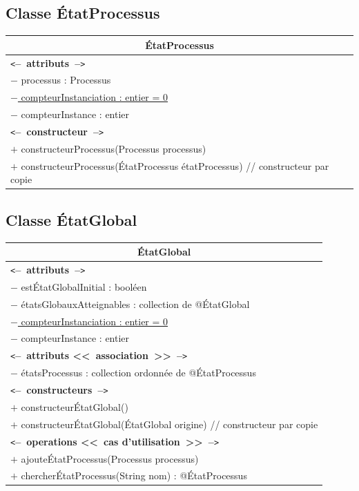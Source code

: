 \documentclass[11pt,article]{article}
\newcommand{\cmt}[1]{\texttt{<}\textbf{--~#1~--}\texttt{>}}
\begin{document}
\subsection{Classe \textsf{ÉtatProcessus}}

\begin{center}
\begin{longtable}{|p{15cm}|} 
\hline
\multicolumn{1}{|c|}{{\Large \textsf{ÉtatProcessus}}} \\
\hline
\cmt{attributs}\\
$-$ processus : Processus \\
\underline{$-$ compteurInstanciation : entier = 0} \\
$-$ compteurInstance : entier \\
\hline
\cmt{constructeur} \\
$+$ constructeurProcessus(Processus processus)\\
$+$ constructeurProcessus(ÉtatProcessus étatProcessus) // constructeur par copie\\
\hline  
\end{longtable}%
\end{center}

\newpage

\subsection{Classe \textsf{ÉtatGlobal}}

\begin{center}
\begin{longtable}{|p{15cm}|} 
\hline
\multicolumn{1}{|c|}{{\Large \textsf{ÉtatGlobal}}} \\
\hline
\cmt{attributs}\\
$-$ estÉtatGlobalInitial : booléen \\
$-$ étatsGlobauxAtteignables : collection de @ÉtatGlobal \\
\underline{$-$ compteurInstanciation : entier = 0} \\
$-$ compteurInstance : entier \\
\cmt{attributs <<~association~>>}\\
$-$ étatsProcessus : collection ordonnée de @ÉtatProcessus \\
\hline
\cmt{constructeurs} \\
$+$ constructeurÉtatGlobal()\\
$+$ constructeurÉtatGlobal(ÉtatGlobal origine) // constructeur par copie\\
\cmt{operations <<~cas d'utilisation~>>} \\
$+$ ajouteÉtatProcessus(Processus processus) \\
$+$ chercherÉtatProcessus(String nom) : @ÉtatProcessus \\
\hline  
\end{longtable}%
\end{center}
\end{document}
